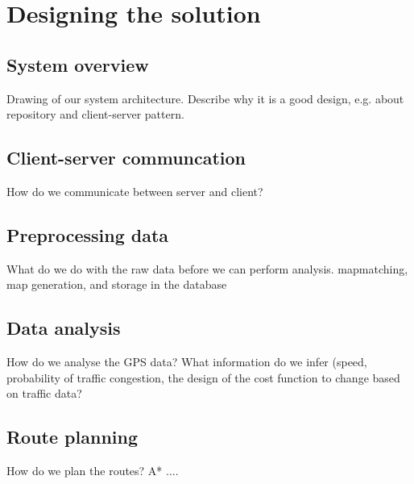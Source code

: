 \section{Designing the solution}
\subsection{System overview}
Drawing of our system architecture. Describe why it is a good design, e.g. about repository and client-server pattern.
\subsection{Client-server communcation}
How do we communicate between server and client?
\subsection{Preprocessing data}
What do we do with the raw data before we can perform analysis. mapmatching, map generation, and storage in the database
\subsection{Data analysis}
How do we analyse the GPS data? What information do we infer (speed, probability of traffic congestion, the design of the cost function to change based on traffic data?
\subsection{Route planning}
How do we plan the routes? A* ....